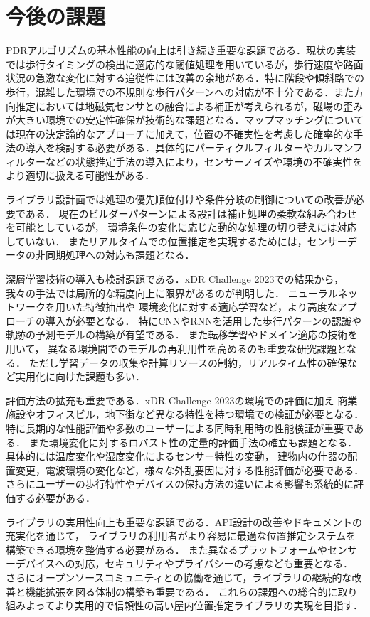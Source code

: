 \section{今後の課題}

PDRアルゴリズムの基本性能の向上は引き続き重要な課題である．現状の実装では歩行タイミングの検出に適応的な閾値処理を用いているが，歩行速度や路面状況の急激な変化に対する追従性には改善の余地がある．特に階段や傾斜路での歩行，混雑した環境での不規則な歩行パターンへの対応が不十分である．また方向推定においては地磁気センサとの融合による補正が考えられるが，磁場の歪みが大きい環境での安定性確保が技術的な課題となる．マップマッチングについては現在の決定論的なアプローチに加えて，位置の不確実性を考慮した確率的な手法の導入を検討する必要がある．具体的にパーティクルフィルターやカルマンフィルターなどの状態推定手法の導入により，センサーノイズや環境の不確実性をより適切に扱える可能性がある．

ライブラリ設計面では処理の優先順位付けや条件分岐の制御についての改善が必要である．
現在のビルダーパターンによる設計は補正処理の柔軟な組み合わせを可能としているが，
環境条件の変化に応じた動的な処理の切り替えには対応していない．
またリアルタイムでの位置推定を実現するためには，センサーデータの非同期処理への対応も課題となる．

深層学習技術の導入も検討課題である．xDR Challenge 2023での結果から，
我々の手法では局所的な精度向上に限界があるのが判明した．
ニューラルネットワークを用いた特徴抽出や
環境変化に対する適応学習など，より高度なアプローチの導入が必要となる．
特にCNNやRNNを活用した歩行パターンの認識や軌跡の予測モデルの構築が有望である．
また転移学習やドメイン適応の技術を用いて，
異なる環境間でのモデルの再利用性を高めるのも重要な研究課題となる．
ただし学習データの収集や計算リソースの制約，リアルタイム性の確保など実用化に向けた課題も多い．

評価方法の拡充も重要である．xDR Challenge 2023の環境での評価に加え
商業施設やオフィスビル，地下街など異なる特性を持つ環境での検証が必要となる．
特に長期的な性能評価や多数のユーザーによる同時利用時の性能検証が重要である．
また環境変化に対するロバスト性の定量的評価手法の確立も課題となる．
具体的には温度変化や湿度変化によるセンサー特性の変動，
建物内の什器の配置変更，電波環境の変化など，様々な外乱要因に対する性能評価が必要である．
さらにユーザーの歩行特性やデバイスの保持方法の違いによる影響も系統的に評価する必要がある．

ライブラリの実用性向上も重要な課題である．API設計の改善やドキュメントの充実化を通じて，
ライブラリの利用者がより容易に最適な位置推定システムを構築できる環境を整備する必要がある．
また異なるプラットフォームやセンサーデバイスへの対応，セキュリティやプライバシーの考慮なども重要となる．
さらにオープンソースコミュニティとの協働を通じて，ライブラリの継続的な改善と機能拡張を図る体制の構築も重要である．
これらの課題への総合的に取り組みよってより実用的で信頼性の高い屋内位置推定ライブラリの実現を目指す．

